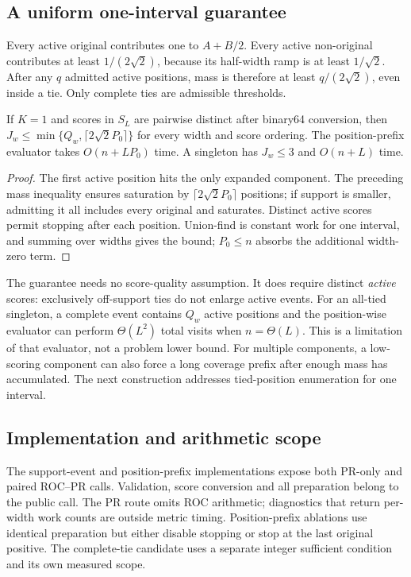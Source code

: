 \subsection{A uniform one-interval guarantee}
Every active original contributes one to $A+B/2$. Every active non-original
contributes at least $1/(2\sqrt2)$, because its half-width ramp is at least
$1/\sqrt2$. After any $q$ admitted active positions, mass is therefore at
least $q/(2\sqrt2)$, even inside a tie. Only complete ties are admissible
thresholds.
\begin{proposition}
If $K=1$ and scores in $S_L$ are pairwise distinct after binary64 conversion,
then $J_w\le\min\{Q_w,\lceil2\sqrt2 P_0\rceil\}$ for every width and score
ordering. The position-prefix evaluator takes $O(n+LP_0)$ time. A singleton
has $J_w\le3$ and $O(n+L)$ time.
\end{proposition}
\begin{proof}
The first active position hits the only expanded component. The preceding
mass inequality ensures saturation by $\lceil2\sqrt2P_0\rceil$ positions;
if support is smaller, admitting it all includes every original and
saturates. Distinct active scores permit stopping after each position.
Union-find is constant work for one interval, and summing over widths gives
the bound; $P_0\le n$ absorbs the additional width-zero term.
\end{proof}

The guarantee needs no score-quality assumption. It does require distinct
\emph{active} scores: exclusively off-support ties do not enlarge active
events. For an all-tied singleton, a complete event contains $Q_w$ active
positions and the position-wise evaluator can perform $\Theta(L^2)$ total
visits when $n=\Theta(L)$. This is a limitation of that evaluator, not a
problem lower bound. For multiple components, a low-scoring component can
also force a long coverage prefix after enough mass has accumulated.
The next construction addresses tied-position enumeration for one interval.



\subsection{Implementation and arithmetic scope}
The support-event and position-prefix implementations expose both PR-only
and paired ROC--PR calls. Validation, score conversion and all preparation
belong to the public call. The PR route omits ROC arithmetic; diagnostics
that return per-width work counts are outside metric timing. Position-prefix
ablations use identical preparation but either disable stopping or stop at
the last original positive. The complete-tie candidate uses a separate
integer sufficient condition and its own measured scope.

